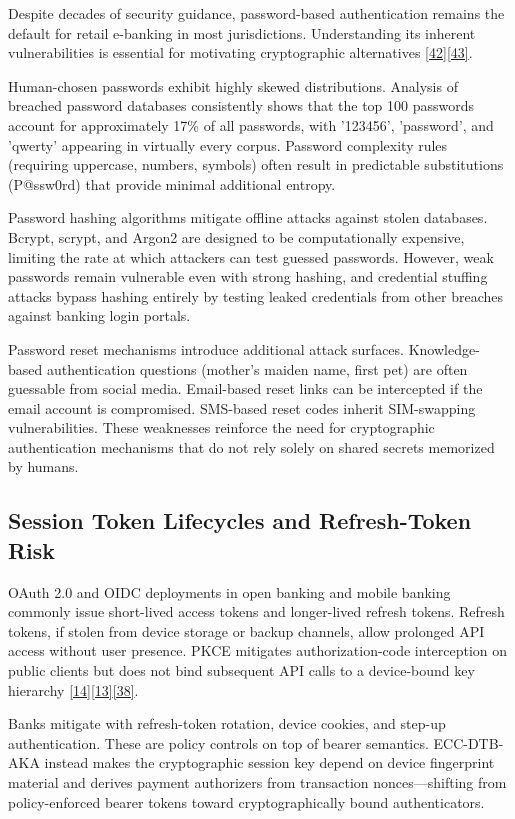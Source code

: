 \indent Despite decades of security guidance, password-based authentication remains the default for retail e-banking in most jurisdictions. Understanding its inherent vulnerabilities is essential for motivating cryptographic alternatives \hyperref[ref:42]{[42]}\hyperref[ref:43]{[43]}.

\indent Human-chosen passwords exhibit highly skewed distributions. Analysis of breached password databases consistently shows that the top 100 passwords account for approximately 17\% of all passwords, with '123456', 'password', and 'qwerty' appearing in virtually every corpus. Password complexity rules (requiring uppercase, numbers, symbols) often result in predictable substitutions (P@ssw0rd) that provide minimal additional entropy.

\indent Password hashing algorithms mitigate offline attacks against stolen databases. Bcrypt, scrypt, and Argon2 are designed to be computationally expensive, limiting the rate at which attackers can test guessed passwords. However, weak passwords remain vulnerable even with strong hashing, and credential stuffing attacks bypass hashing entirely by testing leaked credentials from other breaches against banking login portals.

\indent Password reset mechanisms introduce additional attack surfaces. Knowledge-based authentication questions (mother's maiden name, first pet) are often guessable from social media. Email-based reset links can be intercepted if the email account is compromised. SMS-based reset codes inherit SIM-swapping vulnerabilities. These weaknesses reinforce the need for cryptographic authentication mechanisms that do not rely solely on shared secrets memorized by humans.

\subsection{Session Token Lifecycles and Refresh-Token Risk}

\indent OAuth 2.0 and OIDC deployments in open banking and mobile banking commonly issue short-lived access tokens and longer-lived refresh tokens. Refresh tokens, if stolen from device storage or backup channels, allow prolonged API access without user presence. PKCE mitigates authorization-code interception on public clients but does not bind subsequent API calls to a device-bound key hierarchy \hyperref[ref:14]{[14]}\hyperref[ref:13]{[13]}\hyperref[ref:38]{[38]}.

\indent Banks mitigate with refresh-token rotation, device cookies, and step-up authentication. These are policy controls on top of bearer semantics. ECC-DTB-AKA instead makes the cryptographic session key depend on device fingerprint material and derives payment authorizers from transaction nonces---shifting from policy-enforced bearer tokens toward cryptographically bound authenticators.


